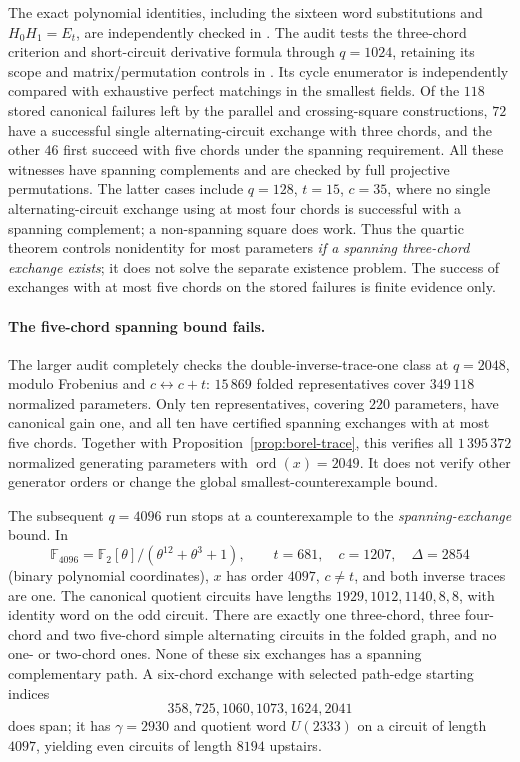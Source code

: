 \documentclass[11pt,a4paper]{article}
\theoremstyle{definition}
\theoremstyle{remark}
\newcommand{\ord}{\operatorname{ord}}
\begin{document}
The exact polynomial identities, including the sixteen word substitutions and $H_0H_1=E_t$, are independently checked in .  The audit  tests the three-chord criterion and short-circuit derivative formula through $q=1024$, retaining its scope and matrix/permutation controls in .  Its cycle enumerator is independently compared with exhaustive perfect matchings in the smallest fields.  Of the $118$ stored canonical failures left by the parallel and crossing-square constructions, $72$ have a successful single alternating-circuit exchange with three chords, and the other $46$ first succeed with five chords under the spanning requirement.  All these witnesses have spanning complements and are checked by full projective permutations.  The latter cases include $q=128$, $t=15$, $c=35$, where no single alternating-circuit exchange using at most four chords is successful with a spanning complement; a non-spanning square does work.  Thus the quartic theorem controls nonidentity for most parameters \emph{if a spanning three-chord exchange exists}; it does not solve the separate existence problem.  The success of exchanges with at most five chords on the stored failures is finite evidence only.

\paragraph{The five-chord spanning bound fails.}
The larger audit  completely checks the double-inverse-trace-one class at $q=2048$, modulo Frobenius and $c\leftrightarrow c+t$: $15\,869$ folded representatives cover $349\,118$ normalized parameters.  Only ten representatives, covering $220$ parameters, have canonical gain one, and all ten have certified spanning exchanges with at most five chords.  Together with Proposition~\ref{prop:borel-trace}, this verifies all $1\,395\,372$ normalized generating parameters with $\ord(x)=2049$.  It does not verify other generator orders or change the global smallest-counterexample bound.

The subsequent $q=4096$ run stops at a counterexample to the \emph{spanning-exchange} bound.  In
\[
 \mathbb F_{4096}=\mathbb F_2[\theta]/(\theta^{12}+\theta^3+1),
 \qquad t=681,\quad c=1207,\quad\Delta=2854
\]
(binary polynomial coordinates), $x$ has order $4097$, $c\ne t$, and both inverse traces are one.  The canonical quotient circuits have lengths $1929,1012,1140,8,8$, with identity word on the odd circuit.  There are exactly one three-chord, three four-chord and two five-chord simple alternating circuits in the folded graph, and no one- or two-chord ones.  None of these six exchanges has a spanning complementary path.  A six-chord exchange with selected path-edge starting indices
\[
                    358,725,1060,1073,1624,2041
\]
does span; it has $\gamma=2930$ and quotient word $U(2333)$ on a circuit of length $4097$, yielding even circuits of length $8194$ upstairs.
\end{document}
